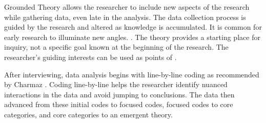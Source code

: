 Grounded Theory allows the researcher to include new aspects of the research while gathering data, even late in the analysis. The data collection process is guided by the research and altered as knowledge is accumulated. It is common for early research to illuminate new angles.  \cite{Charmaz}. The theory provides a starting place for inquiry, not a specific goal known at the beginning of the research. The researcher's guiding interests can be used as points of   \cite{Charmaz}.

After interviewing, data analysis begins with line-by-line coding as recommended by Charmaz \cite{Charmaz}. Coding line-by-line helps the researcher identify nuanced interactions in the data and avoid jumping to conclusions. The data then advanced from these initial codes to focused codes, focused codes to core categories, and core categories to an emergent theory. 

